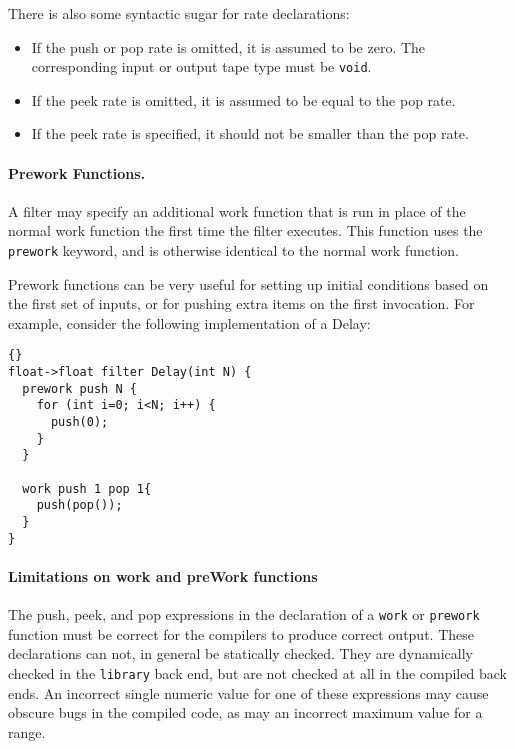\documentclass[11pt]{article}
\begin{document}
\noindent There is also some syntactic sugar for rate declarations:

\begin{itemize}

\item If the push or pop rate is omitted, it is assumed to be zero.
The corresponding input or output tape type must be \lstinline|void|.

\item If the peek rate is omitted, it is assumed to be equal to the
pop rate.

\item If the peek rate is specified, it should not be smaller than the
pop rate.


\end{itemize}

\paragraph{Prework Functions.}  A filter may specify an additional work 
function that is run in place of the normal work function the first
time the filter executes.  This function uses the \lstinline|prework|
keyword, and is otherwise identical to the normal work function.

Prework functions can be very useful for setting up initial conditions
based on the first set of inputs, or for pushing extra items on the
first invocation.  For example, consider the following implementation
of a Delay:

\begin{lstlisting}{}
float->float filter Delay(int N) {
  prework push N {
    for (int i=0; i<N; i++) {
      push(0);
    }
  }

  work push 1 pop 1{
    push(pop());
  }
}
\end{lstlisting}

\paragraph{Limitations on work and preWork functions}
The push, peek, and pop expressions
in the declaration of a \lstinline|work| or \lstinline|prework| function
must be correct for the compilers to produce correct output.  These
declarations can not, in general be statically checked.  They are
dynamically checked in the \lstinline|library| back end, but are not
checked at all in the compiled back ends.  An incorrect single numeric value
for one of these expressions may cause obscure bugs in the compiled
code, as may an incorrect maximum value for a range.
\end{document}

